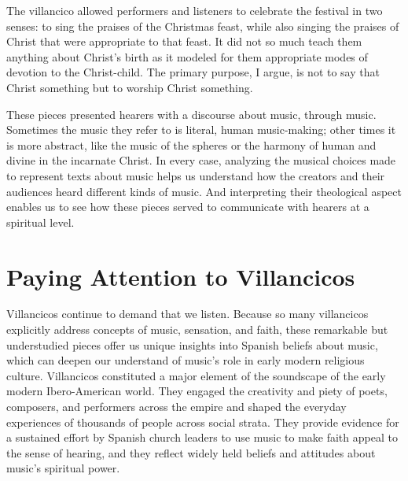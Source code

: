 The villancico allowed performers and listeners to celebrate the festival in two
senses: to sing the praises of the Christmas feast, while also singing the
praises of Christ that were appropriate to that feast. 
It did not so much teach them anything about Christ's birth as it modeled for
them appropriate modes of devotion to the Christ-child.
The primary purpose, I argue, is not to say that Christ  something but
to worship Christ  something.

These pieces presented hearers with a discourse about music, through music.
Sometimes the music they refer to is literal, human music-making; other times
it is more abstract, like the music of the spheres or the harmony of human and
divine in the incarnate Christ.
In every case, analyzing the musical choices made to represent texts about
music helps us understand how the creators and their audiences heard different
kinds of music.
And interpreting their theological aspect enables us to see how these pieces
served to communicate with hearers at a spiritual level.

\section{Paying Attention to Villancicos}

Villancicos continue to demand that we listen. 
Because so many villancicos explicitly address concepts of music, sensation,
and faith, these remarkable but understudied pieces offer us unique insights
into Spanish beliefs about music, which can deepen our understand of music's
role in early modern religious culture.
Villancicos constituted a major element of the soundscape of the
early modern Ibero-American world.
They engaged the creativity and piety of poets, composers, and performers
across the empire and shaped the everyday experiences of thousands of people
across social strata.
They provide evidence for a sustained effort by Spanish church leaders to use
music to make faith appeal to the sense of hearing, and they reflect widely
held beliefs and attitudes about music's spiritual power.

